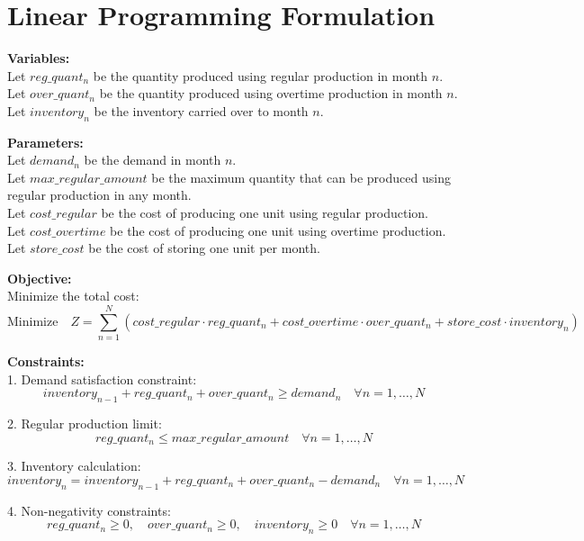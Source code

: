 \documentclass{article}
\begin{document}
\section*{Linear Programming Formulation}

\textbf{Variables:} \\
Let \( reg\_quant_n \) be the quantity produced using regular production in month \( n \). \\
Let \( over\_quant_n \) be the quantity produced using overtime production in month \( n \). \\
Let \( inventory_n \) be the inventory carried over to month \( n \).

\textbf{Parameters:} \\
Let \( demand_n \) be the demand in month \( n \). \\
Let \( max\_regular\_amount \) be the maximum quantity that can be produced using regular production in any month. \\
Let \( cost\_regular \) be the cost of producing one unit using regular production. \\
Let \( cost\_overtime \) be the cost of producing one unit using overtime production. \\
Let \( store\_cost \) be the cost of storing one unit per month.

\textbf{Objective:} \\
Minimize the total cost:
\[
\text{Minimize} \quad Z = \sum_{n=1}^{N} \left( cost\_regular \cdot reg\_quant_n + cost\_overtime \cdot over\_quant_n + store\_cost \cdot inventory_n \right)
\]

\textbf{Constraints:} \\
1. Demand satisfaction constraint:
\[
inventory_{n-1} + reg\_quant_n + over\_quant_n \geq demand_n \quad \forall n = 1, \ldots, N
\]

2. Regular production limit:
\[
reg\_quant_n \leq max\_regular\_amount \quad \forall n = 1, \ldots, N
\]

3. Inventory calculation:
\[
inventory_n = inventory_{n-1} + reg\_quant_n + over\_quant_n - demand_n \quad \forall n = 1, \ldots, N
\]

4. Non-negativity constraints:
\[
reg\_quant_n \geq 0, \quad over\_quant_n \geq 0, \quad inventory_n \geq 0 \quad \forall n = 1, \ldots, N
\]
\end{document}
